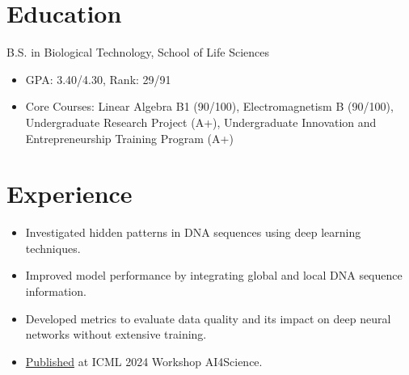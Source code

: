 \documentclass{resume}
\begin{document}



\section{Education}

B.S. in Biological Technology, School of Life Sciences
\begin{itemize}
  \item GPA: 3.40/4.30, Rank: 29/91
  \item Core Courses: Linear Algebra B1 (90/100), Electromagnetism B (90/100), Undergraduate Research Project (A+), Undergraduate Innovation and Entrepreneurship Training Program (A+)
\end{itemize}

\section{Experience}

\begin{itemize}
  \item Investigated hidden patterns in DNA sequences using deep learning techniques.
  \item Improved model performance by integrating global and local DNA sequence information.
\end{itemize}

\begin{itemize}
  \item Developed metrics to evaluate data quality and its impact on deep neural networks without extensive training.
  \item \href{https://openreview.net/forum?id=kmAdBRaShI}{Published} at ICML 2024 Workshop AI4Science.
\end{itemize}
\end{document}
